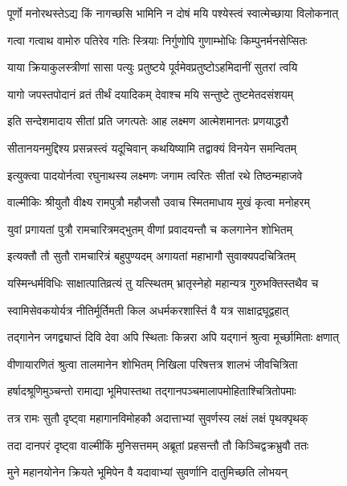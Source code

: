 \twolineshloka
{पूर्णो मनोरथस्तेऽद्य किं नागच्छसि भामिनि}
{न दोषं मयि पश्येस्त्वं स्वात्मेच्छाया विलोकनात्}%

\twolineshloka
{गत्वा गत्वाथ वामोरु पतिरेव गतिः स्त्रियाः}
{निर्गुणोपि गुणाम्भोधिः किम्पुनर्मनसेप्सितः}%

\twolineshloka
{याया क्रियाकुलस्त्रीणां सासा पत्युः प्रतुष्टये}
{पूर्वमेवप्रतुष्टोऽहमिदानीं सुतरां त्वयि}%

\twolineshloka
{यागो जपस्तपोदानं व्रतं तीर्थं दयादिकम्}
{देवाश्च मयि सन्तुष्टे तुष्टमेतदसंशयम्}%


\twolineshloka
{इति सन्देशमादाय सीतां प्रति जगत्पतेः}
{आह लक्ष्मण आत्मेशमानतः प्रणयाद्धरौ}%

\twolineshloka
{सीतानयनमुद्दिश्य प्रसन्नस्त्वं यदूचिवान्}
{कथयिष्यामि तद्वाक्यं विनयेन समन्वितम्}%

\twolineshloka
{इत्युक्त्वा पादयोर्नत्वा रघुनाथस्य लक्ष्मणः}
{जगाम त्वरितः सीतां रथे तिष्ठन्महाजवे}%

\twolineshloka
{वाल्मीकिः श्रीयुतौ वीक्ष्य रामपुत्रौ महौजसौ}
{उवाच स्मितमाधाय मुखं कृत्वा मनोहरम्}%

\twolineshloka
{युवां प्रगायतां पुत्रौ रामचारित्रमद्भुतम्}
{वीणां प्रवादयन्तौ च कलगानेन शोभितम्}%

\twolineshloka
{इत्यक्तौ तौ सुतौ रामचारित्रं बहुपुण्यदम्}
{अगायतां महाभागौ सुवाक्यपदचित्रितम्}%

\twolineshloka
{यस्मिन्धर्मविधिः साक्षात्पातिव्रत्यं तु यत्स्थितम्}
{भ्रातृस्नेहो महान्यत्र गुरुभक्तिस्तथैव च}%

\twolineshloka
{स्वामिसेवकयोर्यत्र नीतिर्मूर्तिमती किल}
{अधर्मकरशास्तिं वै यत्र साक्षाद्रघूद्वहात्}%

\twolineshloka
{तद्गानेन जगद्व्याप्तं दिवि देवा अपि स्थिताः}
{किन्नरा अपि यद्गानं श्रुत्वा मूर्च्छामिताः क्षणात्}%

\twolineshloka
{वीणायारणितं श्रुत्वा तालमानेन शोभितम्}
{निखिला परिषत्तत्र शालभं जीवचित्रिता}%

\twolineshloka
{हर्षादश्रूणिमुञ्चन्तो रामाद्या भूमिपास्तथा}
{तद्गानपञ्चमालापमोहिताश्चित्रितोपमाः}%

\twolineshloka
{तत्र रामः सुतौ दृष्ट्वा महागानविमोहकौ}
{अदात्ताभ्यां सुवर्णस्य लक्षं लक्षं पृथक्पृथक्}%

\twolineshloka
{तदा दानपरं दृष्ट्वा वाल्मीकिं मुनिसत्तमम्}
{अब्रूतां प्रहसन्तौ तौ किञ्चिद्वक्रभ्रुवौ ततः}%

\twolineshloka
{मुने महानयोनेन क्रियते भूमिपेन वै}
{यदावाभ्यां सुवर्णानि दातुमिच्छति लोभयन्}%

